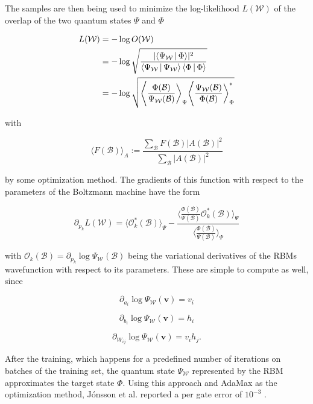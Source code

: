 The samples are then being used to minimize the log-likelihood $L(\mathcal{W})$ of the overlap of the two quantum 
states $\Psi$ and $\Phi$

\begin{align}
    L(\mathcal{W}) &= -\log{O(\mathcal{W})} \\
                   &= -\log{\sqrt{\frac{\lvert \Braket{\Psi_{\mathcal{W}}|\Phi} \rvert^2}{\Braket{\Psi_{\mathcal{W}}|\Psi_{\mathcal{W}}} \Braket{\Phi|\Phi}}}}\\
                   &= -\log{\sqrt{\Bigg\langle \frac{\Phi(\mathcal{B})}{\Psi_{\mathcal{W}}(\mathcal{B})} \bigg \rangle_{\Psi} \Bigg\langle \frac{\Psi_{\mathcal{W}}(\mathcal{B})}{\Phi(\mathcal{B})} \bigg \rangle_{\Phi}^{*}}}
\end{align}

with

\begin{equation}
    \langle F(\mathcal{B})\rangle_A := \frac{\sum_{\mathcal{B}} F(\mathcal{B}) \lvert A(\mathcal{B}) \rvert^2}{\sum_{\mathcal{B}} \lvert A(\mathcal{B})\rvert^2}
\end{equation}

by some optimization method. The gradients of this function with respect to 
the parameters of the Boltzmann machine have the form

\begin{equation}
   \partial_{p_k}L(\mathcal{W}) = \langle \mathcal{O}_k^*(\mathcal{B}) \rangle_{\Psi} - \frac{\langle \frac{\Phi(\mathcal{B})}{\Psi(\mathcal{B})} \mathcal{O}_k^*(\mathcal{B})\rangle_{\Psi}}{\langle \frac{\Phi(\mathcal{B})}{\Psi(\mathcal{B})} \rangle_{\Psi}}
\end{equation}

with $\mathcal{O}_k(\mathcal{B}) = \partial_{p_k}\log{\Psi_{\mathcal{W}}(\mathcal{B})}$ being the variational derivatives of the RBMs wavefunction with respect to its parameters.
These are simple to compute as well, since

\begin{equation}
    \partial_{a_i}\log{\Psi_{\mathcal{W}}(\bm{v})} = v_i
\end{equation}

\begin{equation}
    \partial_{b_i}\log{\Psi_{\mathcal{W}}(\bm{v})} = h_i
\end{equation}

\begin{equation}
    \partial_{W_{ij}}\log{\Psi_{\mathcal{W}}(\bm{v})} = v_ih_j.
\end{equation}

After the training, which happens for a predefined number of iterations on batches of the training set,
the quantum state $\Psi_{\mathcal{W}}$ represented by the RBM approximates the target state $\Phi$. Using
this approach and AdaMax as the optimization method, J\'{o}nsson et al. reported a per gate error of $10^{-3}$ \cite{jnsson2018neuralnetwork}.
